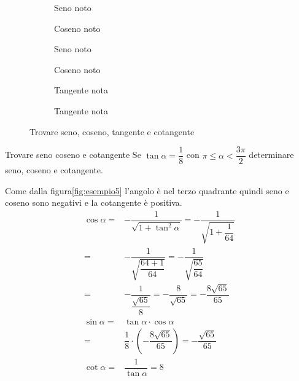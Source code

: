 \begin{figure}
\begin{subfigure}[b]{.5\linewidth}
\centering

\captionsetup{format=esempio}
\caption{Seno noto}\label{fig:esempio1}
\end{subfigure}%
\begin{subfigure}[b]{.5\linewidth}
\centering

\captionsetup{format=esempio}
\caption{Coseno noto}\label{fig:esempio2}
\end{subfigure}%
\quad
\begin{subfigure}[b]{.5\linewidth}
\centering

\captionsetup{format=esempio}
\caption{Seno noto}\label{fig:esempio3}
\end{subfigure}%
\begin{subfigure}[b]{.5\linewidth}
\centering

\captionsetup{format=esempio}
\caption{Coseno noto}\label{fig:esempio4}
\end{subfigure}%
\quad
\begin{subfigure}[b]{.5\linewidth}
	\centering
	
	\caption{Tangente nota}\label{fig:esempio5}
\end{subfigure}%
\begin{subfigure}[b]{.5\linewidth}
	\centering
	
	\caption{Tangente nota}\label{fig:esempio6}
\end{subfigure}%
\caption{Trovare seno, coseno, tangente e cotangente}
\end{figure}
\begin{esempiot}{Trovare seno coseno e cotangente}{}
Se $\tan\alpha=\dfrac{1}{8}$ con $\pi\leq\alpha<\dfrac{3\pi}{2}$ determinare seno, coseno e cotangente.
\end{esempiot}
Come dalla figura\nobs\vref{fig:esempio5} l'angolo è nel terzo quadrante quindi seno e coseno sono negativi e la cotangente è positiva.
\begin{align*}
\cos\alpha=&-\dfrac{1}{\sqrt{1+\tan^2\alpha}}=-\dfrac{1}{\sqrt{1+\dfrac{1}{64}}}\\
=&-\dfrac{1}{\sqrt{\dfrac{64+1}{64}}}=-\dfrac{1}{\sqrt{\dfrac{65}{64}}}\\
=&-\dfrac{1}{\dfrac{\sqrt{65}}{8}}=-\dfrac{8}{\sqrt{65}}=-\dfrac{8\sqrt{65}}{65}\\
\sin\alpha=&\tan\alpha\cdot\cos\alpha\\
=&\dfrac{1}{8}\cdot\left(-\dfrac{8\sqrt{65}}{65}\right)=-\dfrac{\sqrt{65}}{65}\\
\cot\alpha=&\dfrac{1}{\tan\alpha}=8\\
\end{align*}

